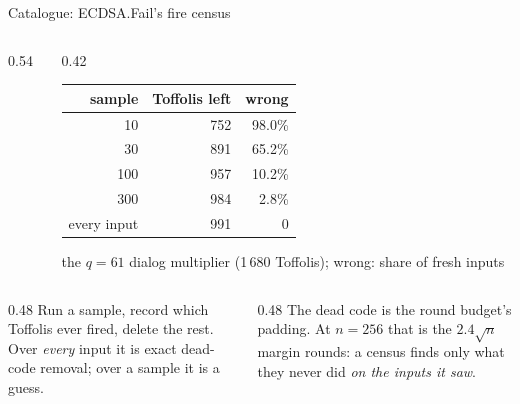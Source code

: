 \documentclass[aspectratio=169,11pt]{beamer}
\newcommand{\code}[2][]{}
\begin{document}
\setcounter{framenumber}{202}
\begin{frame}[fragile]{Catalogue: ECDSA.Fail's fire census}
  \begin{columns}[T]
    \begin{column}{0.54\textwidth}
      \code[basicstyle=\ttfamily\scriptsize]{census.py}
    \end{column}
    \begin{column}{0.42\textwidth}
      \centering\footnotesize
      \renewcommand{\arraystretch}{1.1}
      \begin{tabular}{@{}rrr@{}}
        \toprule
        sample & Toffolis left & wrong \\
        \midrule
        10 & 752 & 98.0\% \\
        30 & 891 & 65.2\% \\
        100 & 957 & 10.2\% \\
        300 & 984 & 2.8\% \\
        every input & 991 & 0 \\
        \bottomrule
      \end{tabular}\par
      {\scriptsize the $q=61$ dialog multiplier (1\,680 Toffolis); wrong: share of fresh inputs}
    \end{column}
  \end{columns}
  \vskip3mm
  \begin{columns}[T]
    \begin{column}{0.48\textwidth}
      \small Run a sample, record which Toffolis ever fired, delete the rest. Over \emph{every} input it is exact dead-code removal; over a sample it is a guess.
    \end{column}
    \begin{column}{0.48\textwidth}
      \small The dead code is the round budget's padding. At $n=256$ that is the $2.4\sqrt n$ margin rounds: a census finds only what they never did \emph{on the inputs it saw}.
    \end{column}
  \end{columns}
\end{frame}
\end{document}
